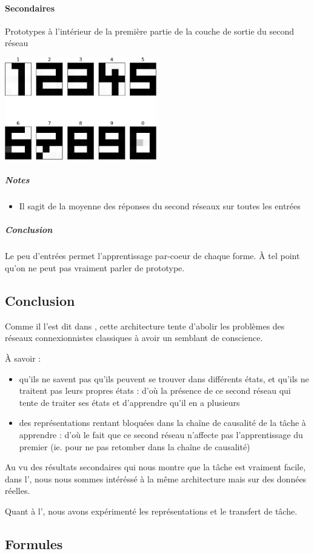     \paragraph{Secondaires}
      Prototypes à l'intérieur de la première partie de la couche de sortie du second réseau
      \begin{center}
	\includegraphics[width=250px]{data/expA1/prototype.png}
      \end{center} 
      \subparagraph{Notes}
	\begin{itemize}
	  \item Il sagit de la moyenne des réponses du second réseaux sur toutes les entrées
	\end{itemize}
      \subparagraph{Conclusion}
	Le peu d'entrées permet l'apprentissage par-coeur de chaque forme. À tel point qu'on ne peut pas vraiment
	parler de prototype.
	
  \subsection{Conclusion}
  Comme il l'est dit dans \cite{Cleeremans_2007}, cette architecture tente d'abolir les problèmes des réseaux connexionnistes
  classiques à avoir un semblant de conscience.
  
  À savoir :
  \begin{itemize}
   \item qu'ils ne savent pas qu'ils peuvent se trouver dans différents états, et qu'ils ne traitent pas leurs propres états : 
   d'où la présence de ce second réseau qui tente de traiter ses états et d'apprendre qu'il en a plusieurs
   \item des représentations rentant bloquées dans la chaîne de causalité de la tâche à apprendre : d'où
   le fait que ce second réseau n'affecte pas l'apprentissage du premier (ie. pour ne pas retomber dans la chaîne de causalité)
   \\[0.2cm]
  \end{itemize}
  
  Au vu des résultats secondaires qui nous montre que la tâche est vraiment facile, dans l',
  nous nous sommes intéréssé à la même architecture mais sur des données réelles.
  
  Quant à l', nous avons expérimenté les représentations et le transfert de tâche.

  \newpage 
  \subsection{Formules}
    
    
    
    


